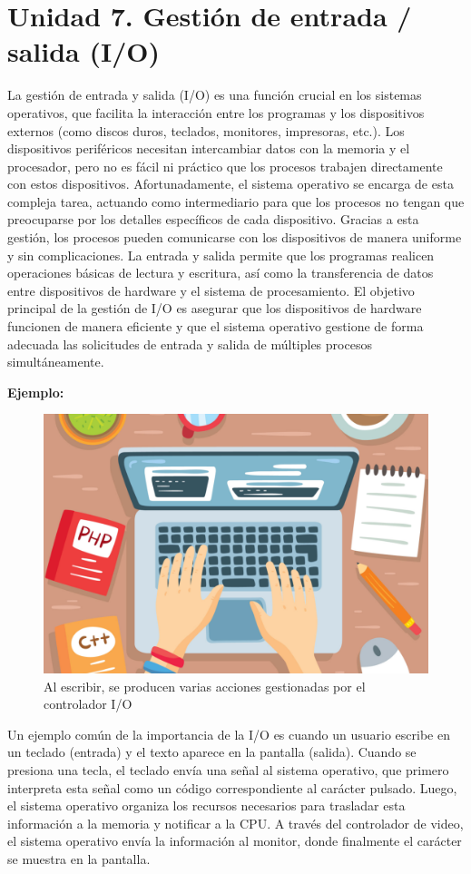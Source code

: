 \chapter{Unidad 7. Gestión de entrada / salida (I/O)}
La gestión de entrada y salida (I/O) es una función crucial en los sistemas operativos, que facilita la interacción entre los programas y los dispositivos externos (como discos duros, teclados, monitores, impresoras, etc.). Los dispositivos periféricos necesitan intercambiar datos con la memoria y el procesador, pero no es fácil ni práctico que los procesos trabajen directamente con estos dispositivos. Afortunadamente, el sistema operativo se encarga de esta compleja tarea, actuando como intermediario para que los procesos no tengan que preocuparse por los detalles específicos de cada dispositivo. Gracias a esta gestión, los procesos pueden comunicarse con los dispositivos de manera uniforme y sin complicaciones. La entrada y salida permite que los programas realicen operaciones básicas de lectura y escritura, así como la transferencia de datos entre dispositivos de hardware y el sistema de procesamiento. El objetivo principal de la gestión de I/O es asegurar que los dispositivos de hardware funcionen de manera eficiente y que el sistema operativo gestione de forma adecuada las solicitudes de entrada y salida de múltiples procesos simultáneamente.

\textbf{Ejemplo:}
\begin{figure}[H] \centering \includegraphics[width=0.7\linewidth]{Imagenes/e-s.png} \caption{Al escribir, se producen varias acciones gestionadas por el controlador I/O} \end{figure}
Un ejemplo común de la importancia de la I/O es cuando un usuario escribe en un teclado (entrada) y el texto aparece en la pantalla (salida). Cuando se presiona una tecla, el teclado envía una señal al sistema operativo, que primero interpreta esta señal como un código correspondiente al carácter pulsado. Luego, el sistema operativo organiza los recursos necesarios para trasladar esta información a la memoria y notificar a la CPU. A través del controlador de video, el sistema operativo envía la información al monitor, donde finalmente el carácter se muestra en la pantalla. 
